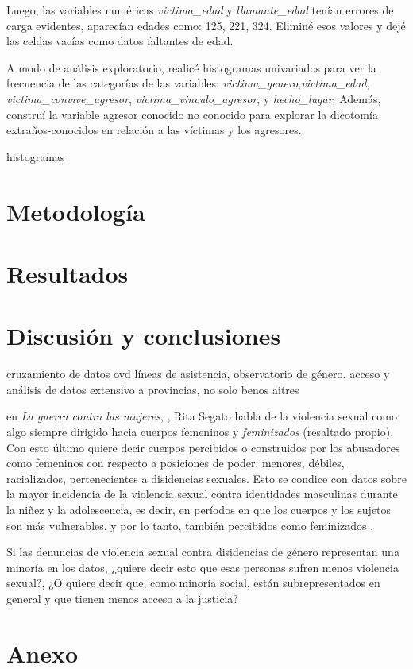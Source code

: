 \documentclass[10 pt]{article}
\begin{document}
 Luego, las variables numéricas \textit{victima\_edad} y \textit{llamante\_edad} tenían errores de carga evidentes, aparecían edades como: 125, 221, 324. Eliminé esos valores y dejé las celdas vacías como datos faltantes de edad. 

A modo de análisis exploratorio, realicé histogramas univariados para ver la frecuencia de las categorías de las variables: \textit{victima\_genero},\textit{victima\_edad}, \textit{victima\_convive\_agresor}, \textit{victima\_vinculo\_agresor},  y \textit{hecho\_lugar}. Además, construí la variable agresor conocido no conocido para explorar la dicotomía extraños-conocidos en relación a las víctimas y los agresores.

histogramas




\section*{Metodología}\label{met}

\section*{Resultados}\label{red}

\section*{Discusión y conclusiones}\label{conc}
cruzamiento de datos ovd líneas de asistencia, observatorio de género.
acceso y análisis de datos extensivo a provincias, no solo benos aitres


en \textit{La guerra contra las mujeres}, \citeyearpar{segato2016guerra}, Rita Segato habla de la violencia sexual como algo siempre dirigido hacia cuerpos femeninos y \textit{feminizados} (resaltado propio). Con esto último quiere decir cuerpos percibidos o construidos por los abusadores como femeninos con respecto a posiciones de poder: menores, débiles, racializados, pertenecientes a disidencias sexuales. Esto se condice con datos sobre la mayor incidencia de la violencia sexual contra identidades masculinas durante la niñez y la adolescencia, es decir, en períodos en que los cuerpos y los sujetos son más vulnerables, y por lo tanto, también percibidos como feminizados \citep*{contreras2016violencia,ufem_relevamiento,ferris2002world}.

Si las denuncias de violencia sexual contra disidencias de género representan una minoría en los datos, ¿quiere decir esto que esas personas sufren menos violencia sexual?, ¿O quiere decir que, como minoría social, están subrepresentados en general y que tienen menos acceso a la justicia?

\newpage




\newpage
\section*{Anexo}\label{anex}
\end{document}
